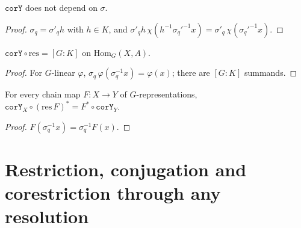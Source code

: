 \begin{lemma}\label{lem:m6-corY-indep}
  \leanok
  $\texttt{corY}$ does not depend on $\sigma$.
\end{lemma}
\begin{proof}
  \leanok
  $\sigma_q=\sigma'_q h$ with $h\in K$, and $\sigma'_qh\,\chi(h^{-1}\sigma_q'^{-1}x)=\sigma'_q\,\chi(\sigma_q'^{-1}x)$.
\end{proof}

\begin{lemma}[{$\mathrm{cor}\circ\mathrm{res}=[G:K]$, cochain level}]\label{lem:m6-corY-res}
  \leanok
  $\texttt{corY}\circ\mathrm{res}=[G:K]$ on $\mathrm{Hom}_G(X,A)$.
\end{lemma}
\begin{proof}
  \leanok
  For $G$-linear $\varphi$, $\sigma_q\,\varphi(\sigma_q^{-1}x)=\varphi(x)$; there are $[G:K]$ summands.
\end{proof}

\begin{lemma}\label{lem:m6-corY-natural}
  \leanok
  For every chain map $F\colon X\to Y$ of $G$-representations, $\texttt{corY}_X\circ(\mathrm{res}\,F)^*=F^*\circ\texttt{corY}_Y$.
\end{lemma}
\begin{proof}
  \leanok
  $F(\sigma_q^{-1}x)=\sigma_q^{-1}F(x)$.
\end{proof}

\section{Restriction, conjugation and corestriction through any resolution}

